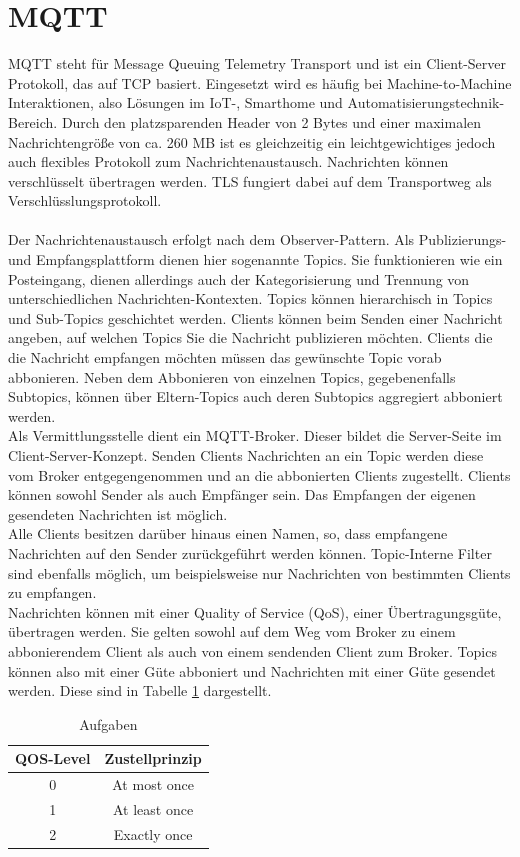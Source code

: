 \documentclass[11pt,a4paper]{report}
\begin{document}
\section{MQTT}
MQTT steht für Message Queuing Telemetry Transport und ist ein Client-Server Protokoll, das auf TCP basiert.
Eingesetzt wird es häufig bei Machine-to-Machine Interaktionen, also Lösungen im IoT-, Smarthome und Automatisierungstechnik-Bereich.
Durch den platzsparenden Header von 2 Bytes und einer maximalen Nachrichtengröße von ca. 260 MB ist es gleichzeitig ein leichtgewichtiges jedoch auch flexibles Protokoll zum Nachrichtenaustausch.
Nachrichten können verschlüsselt übertragen werden.
TLS fungiert dabei auf dem Transportweg als Verschlüsslungsprotokoll.
\\\\
Der Nachrichtenaustausch erfolgt nach dem Observer-Pattern.
Als Publizierungs- und Empfangsplattform dienen hier sogenannte Topics.
Sie funktionieren wie ein Posteingang, dienen allerdings auch der Kategorisierung und Trennung von unterschiedlichen Nachrichten-Kontexten.
Topics können hierarchisch in Topics und Sub-Topics geschichtet werden.
Clients können beim Senden einer Nachricht angeben, auf welchen Topics Sie die Nachricht publizieren möchten.
Clients die die Nachricht empfangen möchten müssen das gewünschte Topic vorab abbonieren.
Neben dem Abbonieren von einzelnen Topics, gegebenenfalls Subtopics, können über Eltern-Topics auch deren Subtopics aggregiert abboniert werden.
\\
Als Vermittlungsstelle dient ein MQTT-Broker.
Dieser bildet die Server-Seite im Client-Server-Konzept.
Senden Clients Nachrichten an ein Topic werden diese vom Broker entgegengenommen und an die abbonierten Clients zugestellt.
Clients können sowohl Sender als auch Empfänger sein.
Das Empfangen der eigenen gesendeten Nachrichten ist möglich.
\\
Alle Clients besitzen darüber hinaus einen Namen, so, dass empfangene Nachrichten auf den Sender zurückgeführt werden können.
Topic-Interne Filter sind ebenfalls möglich, um beispielsweise nur Nachrichten von bestimmten Clients zu empfangen.
\\
Nachrichten können mit einer Quality of Service (QoS), einer Übertragungsgüte, übertragen werden.
Sie gelten sowohl auf dem Weg vom Broker zu einem abbonierendem Client als auch von einem sendenden Client zum Broker.
Topics können also mit einer Güte abboniert und Nachrichten mit einer Güte gesendet werden.
Diese sind in Tabelle \ref{tab:qos} dargestellt.
\begin{table}[htbp]
  \centering
  \begin{tabular}{|c|c|}
      \hline
      \textbf{QOS-Level} & \textbf{Zustellprinzip} \\
      \hline
      0 & At most once \\
		\hline
      1 & At least once \\
      \hline
      2 & Exactly once\\
      \hline
  \end{tabular}
  \caption{Aufgaben}
  \label{tab:qos}
\end{table}
\end{document}
